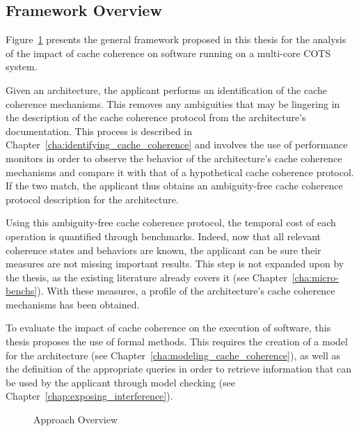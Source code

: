 \subsection{Framework Overview}
\label{sec:second_intro:framework}
Figure~\ref{fig:second_intro:approach} presents the general framework proposed
in this thesis for the analysis of the impact of cache coherence on software
running on a multi-core COTS system.

Given an architecture, the applicant performs an identification of the cache
coherence mechanisms. This removes any ambiguities that may be lingering in the
description of the cache coherence protocol from the architecture's
documentation. This process is described in
Chapter~\ref{cha:identifying_cache_coherence} and involves the use of
performance monitors in order to observe the behavior of the architecture's
cache coherence mechanisms and compare it with that of a hypothetical cache
coherence protocol. If the two match, the applicant thus obtains an
ambiguity-free cache coherence protocol description for the architecture.

Using this ambiguity-free cache coherence protocol, the temporal cost of each
operation is quantified through benchmarks. Indeed, now that all relevant
coherence states and behaviors are known, the applicant can be sure their
measures are not missing important results. This step is not expanded upon by
the thesis, as the existing literature already covers it (see
Chapter~\ref{cha:micro-benchs}). With these measures, a profile of the
architecture's cache coherence mechanisms has been obtained.

To evaluate the impact of cache coherence on the execution of software, this
thesis proposes the use of formal methods. This requires the creation of a model
for the architecture (see Chapter~\ref{cha:modeling_cache_coherence}), as well
as the definition of the appropriate queries in order to retrieve information
that can be used by the applicant through model checking (see
Chapter~\ref{chap:exposing_interference}).

\begin{figure}[hbt!]
\iffalse
\begin{subfigure}[t]{\textwidth}
\centering

\end{subfigure}
\begin{subfigure}[t]{\textwidth}
\vspace{2em}
\centering

\end{subfigure}
\begin{subfigure}[t]{\textwidth}
\vspace{4em}
\centering

\end{subfigure}
\fi
\centering

\caption{Approach Overview}
\label{fig:second_intro:approach}
\end{figure}
